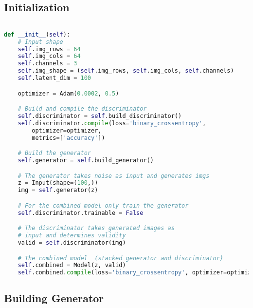 \subsection{Initialization} %
\label{subsec:initialization}
\begin{lstlisting}[basicstyle=\scriptsize,language=Python]

def __init__(self):
    # Input shape
    self.img_rows = 64
    self.img_cols = 64
    self.channels = 3
    self.img_shape = (self.img_rows, self.img_cols, self.channels)
    self.latent_dim = 100

    optimizer = Adam(0.0002, 0.5)

    # Build and compile the discriminator
    self.discriminator = self.build_discriminator()
    self.discriminator.compile(loss='binary_crossentropy',
        optimizer=optimizer,
        metrics=['accuracy'])

    # Build the generator
    self.generator = self.build_generator()

    # The generator takes noise as input and generates imgs
    z = Input(shape=(100,))
    img = self.generator(z)

    # For the combined model only train the generator
    self.discriminator.trainable = False

    # The discriminator takes generated images as 
    # input and determines validity
    valid = self.discriminator(img)

    # The combined model  (stacked generator and discriminator)
    self.combined = Model(z, valid)
    self.combined.compile(loss='binary_crossentropy', optimizer=optimizer)
\end{lstlisting}


\subsection{Building Generator} %
\label{subsec:building_generator}

